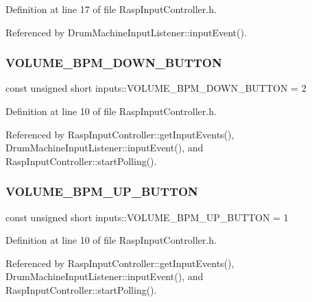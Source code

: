 Definition at line 17 of file Rasp\+Input\+Controller.\+h.



Referenced by Drum\+Machine\+Input\+Listener\+::input\+Event().

\mbox{\label{namespaceinputs_af3cad6ab00b2670e1710698945d28c17}} 
\subsubsection{\texorpdfstring{V\+O\+L\+U\+M\+E\+\_\+\+B\+P\+M\+\_\+\+D\+O\+W\+N\+\_\+\+B\+U\+T\+T\+ON}{VOLUME\_BPM\_DOWN\_BUTTON}}
{\footnotesize\ttfamily const unsigned short inputs\+::\+V\+O\+L\+U\+M\+E\+\_\+\+B\+P\+M\+\_\+\+D\+O\+W\+N\+\_\+\+B\+U\+T\+T\+ON = 2}



Definition at line 10 of file Rasp\+Input\+Controller.\+h.



Referenced by Rasp\+Input\+Controller\+::get\+Input\+Events(), Drum\+Machine\+Input\+Listener\+::input\+Event(), and Rasp\+Input\+Controller\+::start\+Polling().

\mbox{\label{namespaceinputs_ab1d58fe937ccabff6ec4011a74028bfb}} 
\subsubsection{\texorpdfstring{V\+O\+L\+U\+M\+E\+\_\+\+B\+P\+M\+\_\+\+U\+P\+\_\+\+B\+U\+T\+T\+ON}{VOLUME\_BPM\_UP\_BUTTON}}
{\footnotesize\ttfamily const unsigned short inputs\+::\+V\+O\+L\+U\+M\+E\+\_\+\+B\+P\+M\+\_\+\+U\+P\+\_\+\+B\+U\+T\+T\+ON = 1}



Definition at line 10 of file Rasp\+Input\+Controller.\+h.



Referenced by Rasp\+Input\+Controller\+::get\+Input\+Events(), Drum\+Machine\+Input\+Listener\+::input\+Event(), and Rasp\+Input\+Controller\+::start\+Polling().

